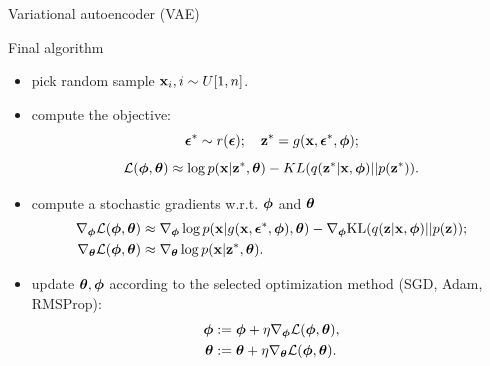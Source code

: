 \begin{frame}{Variational autoencoder (VAE)}
	\begin{block}{Final algorithm}
		\begin{itemize}
			\item pick random sample $\mathbf{x}_i, i \sim U[1, n]$.
			\item compute the objective:
			\vspace{-0.3cm}
			\[
				\boldsymbol{\epsilon}^* \sim r(\boldsymbol{\epsilon}); \quad \mathbf{z}^* = g(\mathbf{x}, \boldsymbol{\epsilon}^*, \boldsymbol{\phi});
			\]
			\[
				\mathcal{L}(\boldsymbol{\phi}, \boldsymbol{\theta}) \approx  \log p(\mathbf{x} | \mathbf{z}^*, \boldsymbol{\theta}) - KL(q(\mathbf{z}^* | \mathbf{x}, \boldsymbol{\phi}) || p(\mathbf{z}^*)).
			\]
			\item compute a stochastic gradients w.r.t. $\boldsymbol{\phi}$ and $\boldsymbol{\theta}$
			\begin{align*}
				\nabla_{\boldsymbol{\phi}} \mathcal{L} (\boldsymbol{\phi}, \boldsymbol{\theta}) &\approx \nabla_{\boldsymbol{\phi}} \log p(\mathbf{x} | g(\mathbf{x}, \boldsymbol{\epsilon}^*, \boldsymbol{\phi}), \boldsymbol{\theta})  - \nabla_{\boldsymbol{\phi}} \text{KL}(q(\mathbf{z} | \mathbf{x}, \boldsymbol{\phi}) || p(\mathbf{z})); \\
				\nabla_{\boldsymbol{\theta}} \mathcal{L} (\boldsymbol{\phi}, \boldsymbol{\theta}) &\approx \nabla_{\boldsymbol{\theta}} \log p(\mathbf{x}|\mathbf{z}^*, \boldsymbol{\theta}).
			\end{align*}
			\item update $\boldsymbol{\theta}, \boldsymbol{\phi}$ according to the selected optimization method (SGD, Adam, RMSProp):
			\begin{align*}
				\boldsymbol{\phi} &:= \boldsymbol{\phi} + \eta \nabla_{\boldsymbol{\phi}} \mathcal{L}(\boldsymbol{\phi}, \boldsymbol{\theta}), \\
				\boldsymbol{\theta} &:= \boldsymbol{\theta} + \eta \nabla_{\boldsymbol{\theta}} \mathcal{L}(\boldsymbol{\phi}, \boldsymbol{\theta}).
			\end{align*}
		\end{itemize}
	\end{block}
\end{frame}
